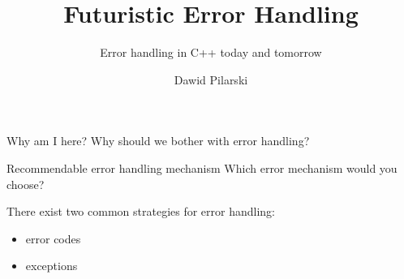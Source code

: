 \documentclass[10pt]{beamer}
\title{Futuristic Error Handling}
\subtitle{Error handling in C++ today and tomorrow}
\date{}
\author{Dawid Pilarski}
\institute{dawid.pilarski@panicsofware.com}
\begin{document}
\maketitle


\begin{frame}{Why am I here?}
	Why should we bother with error handling?
\end{frame}

\begin{frame}{Recommendable error handling mechanism}
	Which error mechanism would you choose?
	
	There exist two common strategies for error handling:
	\begin{itemize}
		\item error codes
		\item exceptions
	\end{itemize}
\end{frame}
\end{document}

